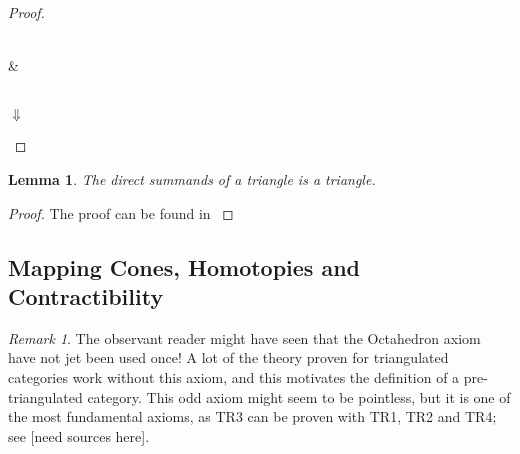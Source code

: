 \documentclass[12pt]{article}
\newtheorem{lemma}[theorem]{Lemma}
\theoremstyle{definition}
\theoremstyle{remark}
\newtheorem*{remark}{Remark}
\begin{document}
\begin{proof}
                \begin{center}
                     \\
                    \& \\
                     \\
                    $\Downarrow$ \\
                \end{center}
            \end{proof}

            \begin{lemma}
                The direct summands of a triangle is a triangle.
            \end{lemma}

            \begin{proof}
                The proof can be found in \cite{neeman}
            \end{proof}
            
            \subsection{Mapping Cones, Homotopies and Contractibility}
            \begin{remark}
                The observant reader might have seen that the Octahedron axiom have not jet been used once! A lot of the theory proven for triangulated categories work without this axiom, and this motivates the definition of a pre-triangulated category. This odd axiom might seem to be pointless, but it is one of the most fundamental axioms, as TR3 can be proven with TR1, TR2 and TR4; see [need sources here].
            \end{remark}
\end{document}
